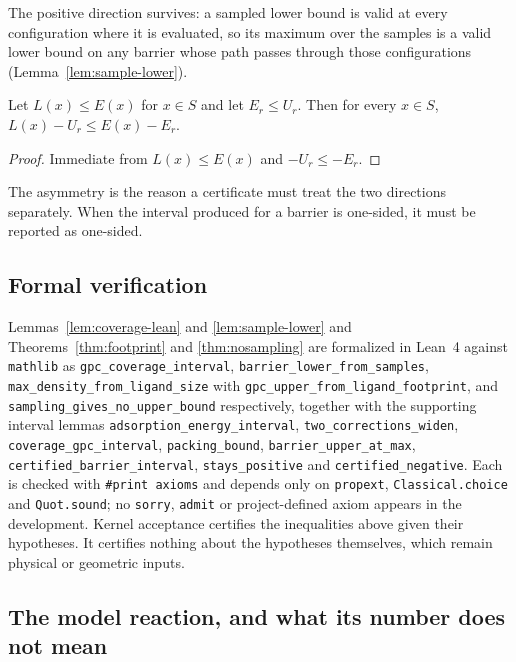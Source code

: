 The positive direction survives: a sampled lower bound is valid at every
configuration where it is evaluated, so its maximum over the samples is a valid
lower bound on any barrier whose path passes through those configurations
(Lemma~\ref{lem:sample-lower}).

\begin{lemma}
\label{lem:sample-lower}
Let $L(x)\le E(x)$ for $x\in S$ and let $E_r\le U_r$. Then for every $x\in S$,
$L(x)-U_r \le E(x)-E_r$.
\end{lemma}
\begin{proof}
Immediate from $L(x)\le E(x)$ and $-U_r\le-E_r$.
\end{proof}

The asymmetry is the reason a certificate must treat the two directions
separately. When the interval produced for a barrier is one-sided, it must be
reported as one-sided.

\subsection{Formal verification}

Lemmas~\ref{lem:coverage-lean} and \ref{lem:sample-lower} and
Theorems~\ref{thm:footprint} and \ref{thm:nosampling} are formalized in Lean~4
against \texttt{mathlib} as \texttt{gpc\_coverage\_interval},
\texttt{barrier\_lower\_from\_samples},
\texttt{max\_density\_from\_ligand\_size} with
\texttt{gpc\_upper\_from\_ligand\_footprint}, and
\texttt{sampling\_gives\_no\_upper\_bound} respectively, together with the
supporting interval lemmas \texttt{adsorption\_energy\_interval},
\texttt{two\_corrections\_widen}, \texttt{coverage\_gpc\_interval},
\texttt{packing\_bound}, \texttt{barrier\_upper\_at\_max},
\texttt{certified\_barrier\_interval}, \texttt{stays\_positive} and
\texttt{certified\_negative}. Each is checked with \texttt{\#print axioms} and
depends only on \texttt{propext}, \texttt{Classical.choice} and
\texttt{Quot.sound}; no \texttt{sorry}, \texttt{admit} or project-defined axiom
appears in the development. Kernel acceptance certifies the inequalities above
given their hypotheses. It certifies nothing about the hypotheses themselves,
which remain physical or geometric inputs.

\subsection{The model reaction, and what its number does not mean}

